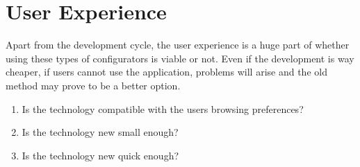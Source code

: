 \section{User Experience}
Apart from the development cycle, the user experience is a huge part of whether using these types of configurators is viable or not. Even if the development is way cheaper, if users cannot use the application, problems will arise and the old method may prove to be a better option.\begin{enumerate}
\item {Is the technology compatible with the users browsing preferences?}
\item {Is the technology new small enough?}
\item {Is the technology new quick enough?}
\end{enumerate}



